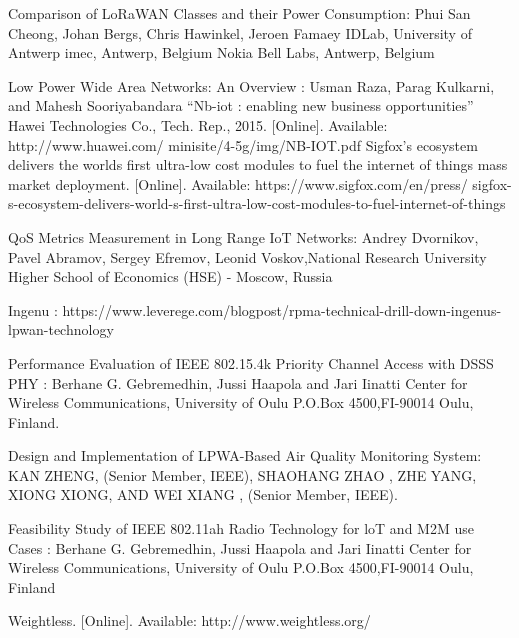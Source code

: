\documentclass[12pt,a4paper,openright,twoside]{report}
\begin{document}
\begin{thebibliography}{90}             %
\rhead[\fancyplain{}{\bfseries \leftmark}]{\fancyplain{}{\bfseries
\thepage}}
 Comparison of LoRaWAN Classes and their Power Consumption: Phui San Cheong, Johan Bergs, Chris Hawinkel, Jeroen Famaey IDLab, University of Antwerp imec, Antwerp, Belgium Nokia Bell Labs, Antwerp, Belgium


 Low Power Wide Area Networks: An Overview : Usman Raza, Parag Kulkarni, and Mahesh Sooriyabandara
 ``Nb-iot : enabling new business opportunities'' Hawei Technologies
Co., Tech. Rep., 2015. [Online]. Available: http://www.huawei.com/
minisite/4-5g/img/NB-IOT.pdf
 Sigfox's ecosystem delivers the worlds first ultra-low cost
modules to fuel the internet of things mass market
deployment. [Online]. Available: https://www.sigfox.com/en/press/
sigfox-s-ecosystem-delivers-world-s-first-ultra-low-cost-modules-to-fuel-internet-of-things

 QoS Metrics Measurement in Long Range IoT Networks: Andrey Dvornikov, Pavel Abramov, Sergey Efremov, Leonid Voskov,National Research University Higher School of Economics (HSE) - Moscow, Russia 

 Ingenu : https://www.leverege.com/blogpost/rpma-technical-drill-down-ingenus-lpwan-technology

 Performance Evaluation of IEEE 802.15.4k Priority Channel Access with DSSS PHY : Berhane G. Gebremedhin, Jussi Haapola and Jari Iinatti Center for Wireless Communications, University of Oulu P.O.Box 4500,FI-90014 Oulu, Finland.

 Design and Implementation of LPWA-Based Air Quality Monitoring System: KAN ZHENG, (Senior Member, IEEE), SHAOHANG ZHAO , ZHE YANG, XIONG XIONG, AND WEI XIANG , (Senior Member, IEEE).

 Feasibility Study of IEEE 802.11ah Radio Technology for loT and M2M use Cases : Berhane G. Gebremedhin, Jussi Haapola and Jari Iinatti Center for Wireless Communications, University of Oulu P.O.Box 4500,FI-90014 Oulu, Finland

 Weightless. [Online]. Available: http://www.weightless.org/


\end{thebibliography}
\end{document}
